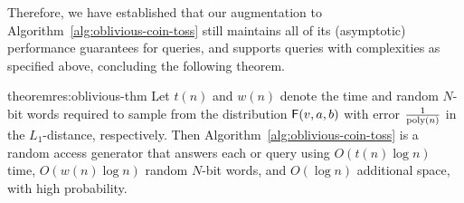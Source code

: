 Therefore, we have established that our augmentation to Algorithm~\ref{alg:oblivious-coin-toss} still maintains all of its (asymptotic) performance guarantees for  queries, and supports  queries with complexities as specified above, concluding the following theorem.
\begin{restatable}{theorem}{res:oblivious-thm}
Let $t(n)$ and $w(n)$ denote the time and random $N$-bit words required to sample from the distribution $\mathsf{F}(v,a,b)$ with error $\frac{1}{\mathrm{poly}(n)}$ in the $L_1$-distance, respectively. Then Algorithm~\ref{alg:oblivious-coin-toss} is a random access generator that answers each  or  query using $O(t(n) \log n)$ time, $O(w(n) \log n)$ random $N$-bit words, and $O(\log n)$ additional space, with high probability.
\end{restatable} 
\fi
